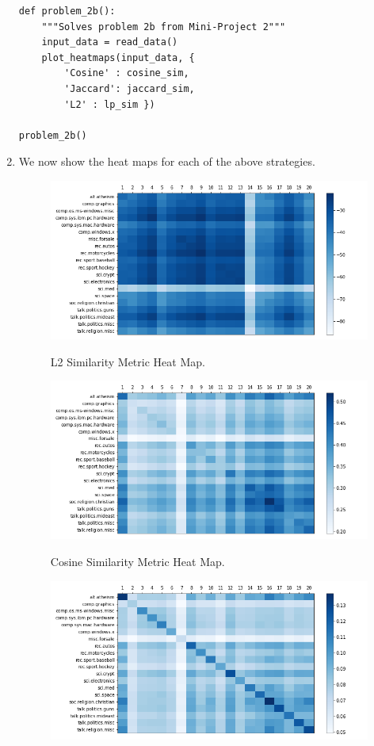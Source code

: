 \documentclass[12pt]{article}
\begin{document}
\begin{enumerate}[label=(\alph*)]
\begin{verbatim}
def problem_2b():
    """Solves problem 2b from Mini-Project 2"""
    input_data = read_data()
    plot_heatmaps(input_data, {
        'Cosine' : cosine_sim,
        'Jaccard': jaccard_sim,
        'L2' : lp_sim })

problem_2b()
    \end{verbatim}
  \item
    We now show the heat maps for each of the above strategies.

    \begin{figure}[!ht]
      \centering
      \includegraphics[scale=0.6]{figures/L2.png}
      \begin{caption}
        L2 Similarity Metric Heat Map.
      \end{caption}
    \end{figure}
    \begin{figure}[!ht]
      \centering
      \includegraphics[scale=0.6]{figures/Cosine.png}
      \begin{caption}
        Cosine Similarity Metric Heat Map.
      \end{caption}
    \end{figure}
    \begin{figure}[!ht]
      \centering
      \includegraphics[scale=0.6]{figures/Jaccard.png}

\end{figure}
\end{enumerate}
\end{document}
